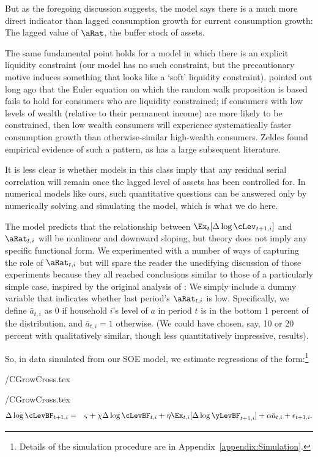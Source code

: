 \documentclass[titlepage]{\econtex}\newcommand{\texname}{cAndCwithStickyE}
\begin{document}
But as the foregoing discussion suggests, the model says there is a much more direct indicator than lagged consumption growth for current consumption growth:  The lagged value of $\aRat$, the buffer stock of assets.

The same fundamental point holds for a model in which there is an explicit liquidity constraint (our model has no such constraint, but the precautionary motive induces something that looks like a `soft' liquidity constraint).  \cite{zeldes:jpe} pointed out long ago that the Euler equation on which the random walk proposition is based fails to hold for consumers who are liquidity constrained; if consumers with low levels of wealth (relative to their permanent income) are more likely to be constrained, then low wealth consumers will experience systematically faster consumption growth than otherwise-similar high-wealth consumers.  Zeldes found empirical evidence of such a pattern, as has a large subsequent literature.

It is less clear is whether models in this class imply that any residual serial correlation will remain once the lagged level of assets has been controlled for.  In numerical models like ours, such quantitative questions can be answered only by numerically solving and simulating the model, which is what we do here.

The model predicts that the relationship between $\Ex_{t}[\Delta \log \cLev_{t+1,i}]$ and $\aRat_{t,i}$ will be nonlinear and downward sloping, but theory does not imply any specific functional form.  We experimented with a number of ways of capturing the role of $\aRat_{t,i}$ but will spare the reader the unedifying discussion of those experiments because they all reached conclusions similar to those of a particularly simple case, inspired by the original analysis of \cite{zeldes:jpe}: We simply include a dummy variable that indicates whether last period's $\aRat_{t,i}$ is low.  Specifically, we define $\bar{a}_{t,i}$ as 0 if household $i$'s level of ${a}$ in period $t$ is in the bottom 1 percent of the distribution, and $\bar{a}_{t,i}=1$ otherwise.  (We could have chosen, say, 10 or 20 percent with qualitatively similar, though less quantitatively impressive, results).

So, in data simulated from our SOE model, we estimate regressions of the form:\footnote{Details of the simulation procedure are in Appendix~\ref{appendix:Simulation}.}
\begin{verbatimwrite}{\eq/CGrowCross.tex}
   \newcommand{\CGrowCross}{\Delta \log       \cLevBF _{t+1,i}  &=&  \varsigma + \chi \Delta \log      \cLevBF _{t,i} + \eta     {\Ex}_{t,i}[\Delta \log       \yLevBF _{t+1,i}]+ {\alpha} \bar{a}_{t,i}+\epsilon_{t+1,i}.}
\newcommand{\CGrowCrossBar}{\Delta \log  \perc{\cLevBF}_{t+1,i}  &=&  \varsigma + \chi \Delta \log \perc{\cLevBF}_{t,i} + \eta     {\Ex}_{t,i}[\Delta \log \perc{\yLevBF}_{t+1,i}] + {\alpha} {\perc{a}}_{t,i}+\epsilon_{t+1,i}.}
\end{verbatimwrite}
 \eq/CGrowCross.tex
\begin{eqnarray}
\CGrowCross
\end{eqnarray}
\end{document}

